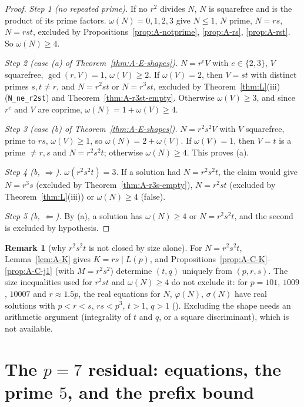 \documentclass[11pt,reqno]{amsart}
\newcommand{\ph}{\varphi}
\newcommand{\sig}{\sigma}
\theoremstyle{definition}
\newtheorem{remark}[theorem]{Remark}
\begin{document}
\begin{proof}
\textit{Step 1 (no repeated prime).} If no \(r^2\) divides \(N\), \(N\) is squarefree and is the product of its prime factors. \(\omega(N)=0,1,2,3\) give \(N\le 1\), \(N\) prime, \(N=rs\), \(N=rst\), excluded by Propositions~\ref{prop:A-notprime}, \ref{prop:A-rs}, \ref{prop:A-rst}. So \(\omega(N)\ge 4\).

\textit{Step 2 (case (a) of Theorem~\ref{thm:A-E-shapes}).} \(N=r^eV\) with \(e\in\{2,3\}\), \(V\) squarefree, \(\gcd(r,V)=1\), \(\omega(V)\ge 2\). If \(\omega(V)=2\), then \(V=st\) with distinct primes \(s,t\ne r\), and \(N=r^2st\) or \(N=r^3st\), excluded by Theorem~\ref{thm:L}(iii) (\texttt{N\_ne\_r2st}) and Theorem~\ref{thm:A-r3st-empty}. Otherwise \(\omega(V)\ge 3\), and since \(r^e\) and \(V\) are coprime, \(\omega(N)=1+\omega(V)\ge 4\).

\textit{Step 3 (case (b) of Theorem~\ref{thm:A-E-shapes}).} \(N=r^2s^2V\) with \(V\) squarefree, prime to \(rs\), \(\omega(V)\ge 1\), so \(\omega(N)=2+\omega(V)\). If \(\omega(V)=1\), then \(V=t\) is a prime \(\ne r,s\) and \(N=r^2s^2t\); otherwise \(\omega(N)\ge 4\). This proves (a).

\textit{Step 4 (b, \(\Rightarrow\)).} \(\omega(r^2s^2t)=3\). If a solution had \(N=r^2s^2t\), the claim would give \(N=r^3s\) (excluded by Theorem~\ref{thm:A-r3s-empty}), \(N=r^2st\) (excluded by Theorem~\ref{thm:L}(iii)) or \(\omega(N)\ge 4\) (false).

\textit{Step 5 (b, \(\Leftarrow\)).} By (a), a solution has \(\omega(N)\ge 4\) or \(N=r^2s^2t\), and the second is excluded by hypothesis.
\end{proof}

\begin{remark}[why \(r^2s^2t\) is not closed by size alone]
For \(N=r^2s^2t\), Lemma~\ref{lem:A-K} gives \(K=rs\mid L(p)\), and Propositions~\ref{prop:A-C-K}--\ref{prop:A-C-j1} (with \(M=r^2s^2\)) determine \((t,q)\) uniquely from \((p,r,s)\). The size inequalities used for \(r^2st\) and \(\omega(N)\ge 4\) do not exclude it: for \(p=101\), \(1009\), \(10007\) and \(r\approx 1.5p\), the real equations for \(N\), \(\ph(N)\), \(\sig(N)\) have real solutions with \(p<r<s\), \(rs<p^3\), \(t>1\), \(q>1\) (). Excluding the shape needs an arithmetic argument (integrality of \(t\) and \(q\), or a square discriminant), which is not available.
\end{remark}

\section{The \(p=7\) residual: equations, the prime \(5\), and the prefix bound}
\label{sec:A-p7}
\end{document}
